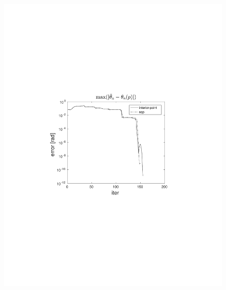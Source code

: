 \documentclass{beamer}
\begin{document}
\begin{frame}
\begin{columns}[t]
\begin{figure}
                \includegraphics[trim=4cm 9cm 4cm 8.5cm, clip=true, width=\linewidth]{img/convPlotT_ref2}
            \end{figure}
    \end{columns}
\end{frame}
\end{document}
